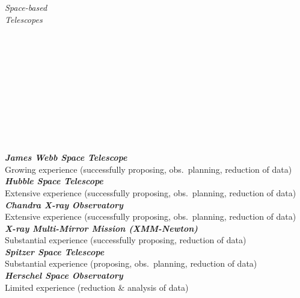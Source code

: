 \documentclass[11pt]{article}
\begin{document}
\vspace{4mm}

\hspace{2.5mm} \parbox{1.5in}{\textit{Space-based \\ Telescopes \\\\\\\\\\\\\\\\\\\\\\}} \parbox{5.15in}{
\textbf{\textit{James Webb Space Telescope}}\\
Growing experience (successfully proposing, obs.~planning, reduction of data)
\textbf{\textit{Hubble Space Telescope}} \\
Extensive experience (successfully proposing, obs.~planning, reduction of data)\\
\textbf{\textit{Chandra X-ray Observatory}} \\
Extensive experience (successfully proposing, obs.~planning, reduction of data)\\
\textbf{\textit{ X-ray Multi-Mirror Mission (XMM-Newton)}} \\
Substantial experience (successfully proposing, reduction of data)\\
\textbf{\textit{Spitzer Space Telescope}} \\
Substantial experience (proposing, obs.~planning, reduction of data)\\
\textbf{\textit{Herschel Space Observatory}} \\
Limited experience (reduction \& analysis of data)\\
}\\
\end{document}
